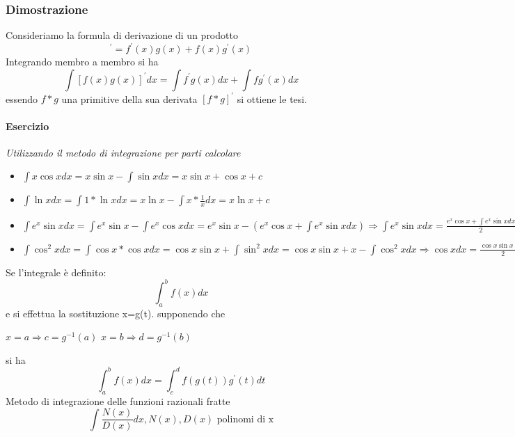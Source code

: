 \subsubsection{Dimostrazione}
Consideriamo la formula di derivazione di un prodotto
\begin{equation*}
	[f(x)g(x)]^\prime=f^\prime (x)g(x)+f(x)g^\prime(x)
\end{equation*}
Integrando membro a membro si ha
\begin{equation*}
	\int [f(x)g(x)]^\prime dx=\int f^\prime g(x)dx+\int f g^\prime(x)dx
\end{equation*}
essendo $f*g$ una primitive della sua derivata $[f*g]^\prime$ si ottiene le tesi.
\paragraph{Esercizio}
\textit{Utilizzando il metodo di integrazione per parti calcolare}
\begin{itemize}
	\item $\int x\cos x dx=x\sin x-\int \sin xdx=x\sin x+\cos x +c$
	\item $\int \ln xdx=\int 1*\ln xdx=x\ln x-\int x*\frac{1}{x}dx=x\ln x+c$
	\item $\int e^x\sin xdx=\int e^x\sin x-\int e^x \cos xdx=e^x\sin x-(e^x \cos x+\int e^x \sin xdx) \Rightarrow \int e^x \sin xdx=\frac{e^x\cos x+\int e^x \sin xdx}{2}=\frac{e^x(\sin x-\cos x)}{2}+c$
	\item $\int \cos^2 xdx=\int \cos x*\cos xdx =\cos x \sin x + \int \sin^2 xdx=\cos x\sin x +x-\int \cos^2 xdx \Rightarrow\cos xdx=\frac{\cos x\sin x +x}{2}+c$
\end{itemize}
Se l'integrale è definito:
\begin{equation}
	\int^b_a f(x)dx
\end{equation}
e si effettua la sostituzione x=g(t). supponendo che
\begin{tasks}
	\task $x=a\Rightarrow c=g^{-1}(a)$
	\task $x=b\Rightarrow d=g^{-1}(b)$
\end{tasks}
si ha
\begin{equation*}
	\int^b_a f(x)dx=\int^d_c f(g(t))g^\prime(t)dt
\end{equation*}
Metodo di integrazione delle funzioni razionali fratte
\begin{equation*}
	\int \frac{N(x)}{D(x)}dx, N(x), D(x) \text{ polinomi di x}
\end{equation*}

